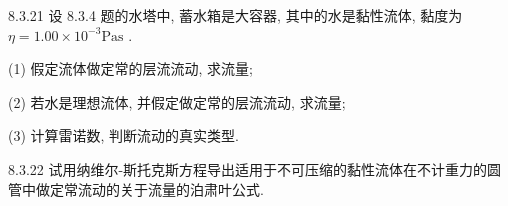 \begin{problem}{8.3.21}
设 8.3.4 题的水塔中, 蓄水箱是大容器, 其中的水是黏性流体, 黏度为 $\eta = 1.00 \times 10^{-3} \mathrm{Pas}$ .

(1) 假定流体做定常的层流流动, 求流量;

(2) 若水是理想流体, 并假定做定常的层流流动, 求流量;

(3) 计算雷诺数, 判断流动的真实类型.
\end{problem}
\clearpage


\begin{problem}{8.3.22}
试用纳维尔-斯托克斯方程导出适用于不可压缩的黏性流体在不计重力的圆管中做定常流动的关于流量的泊肃叶公式.
\end{problem}
\clearpage

